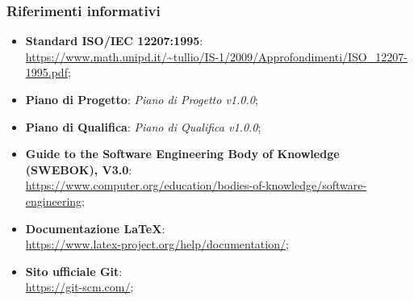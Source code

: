 	
	\subsubsection{Riferimenti informativi}
	\begin{itemize}
		\item \textbf{Standard ISO/IEC 12207:1995}: \\
		\url{https://www.math.unipd.it/~tullio/IS-1/2009/Approfondimenti/ISO_12207-1995.pdf};
		\item \textbf{Piano di Progetto}: \textit{Piano di Progetto v1.0.0};
		\item \textbf{Piano di Qualifica}: \textit{Piano di Qualifica v1.0.0};
		\item \textbf{Guide to the Software Engineering Body of Knowledge (SWEBOK), V3.0}:\\
		\url{https://www.computer.org/education/bodies-of-knowledge/software-engineering};
		\item \textbf{Documentazione \LaTeX{}}: \\
		\url{https://www.latex-project.org/help/documentation/};
		\item \textbf{Sito ufficiale Git}: \\
		\url{https://git-scm.com/};
	\end{itemize}